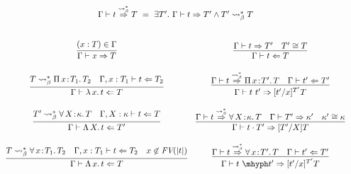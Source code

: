 \documentclass{article}
\newcommand{\abs}[4]{{#1}\, #2\! : \! #3.\, #4}
\newcommand{\absu}[3]{{#1}\, #2.\, #3}
\newcommand{\tpcheck}[0]{\Leftarrow}
\newcommand{\tpsynth}[0]{\Rightarrow}
\newcommand{\tpsynthleads}[0]{\ensuremath{\overset{\leadsto_\beta^*}{\Rightarrow}}}
\begin{document}
\begin{figure}
  \[
    \begin{array}{c}
      \Gamma \vdash t \tpsynthleads T\ =\ \exists T'.\ \Gamma
      \vdash t \tpsynth T' \land T' \leadsto_\beta^* T
      \\ \\ \\
  \begin{array}{cc}
    \infer{\Gamma\vdash x\tpsynth T}{(x : T)\in\Gamma} &
    \infer{\Gamma\vdash t\tpcheck T}{\Gamma\vdash t\tpsynth T' & T' \cong T} \\ \\
    \infer{\Gamma\vdash \absu{\lambda}{x}{t} \tpcheck T}{T \leadsto_\beta^* \abs{\Pi}{x}{T_1}{T_2} & \Gamma,x:T_1\vdash t\tpcheck T_2} &
    \infer{\Gamma\vdash t\ t' \tpsynth [t'/x]^{T'}T}{\Gamma\vdash t \tpsynthleads \abs{\Pi}{x}{T'}{T} & \Gamma\vdash t' \tpcheck T'} \\ \\

    \infer{\Gamma\vdash \absu{\Lambda}{X}{t} \tpcheck T'}
          {T' \leadsto_\beta^* \abs{\forall}{X}{\kappa}{T} & \Gamma,X:\kappa\vdash t \tpcheck T} &
    \infer{\Gamma\vdash t \cdot T' \tpsynth [T'/X]T}
          {\Gamma\vdash t \tpsynthleads \abs{\forall}{X}{\kappa}{T} & \Gamma\vdash T' \tpsynth \kappa' & \kappa'\cong\kappa} \\ \\

    \infer{\Gamma\vdash \absu{\Lambda}{x}{t} \tpcheck T}
          {T \leadsto_\beta^* \abs{\forall}{x}{T_1}{T_2} & \Gamma,x:T_1\vdash t \tpcheck T_2 & x\not\in\textit{FV}(|t|)} &
    \infer{\Gamma\vdash t\ \mhyph t' \tpsynth [t'/x]^{T'}T}{\Gamma\vdash t \tpsynthleads \abs{\forall}{x}{T'}{T} & \Gamma\vdash t' \tpcheck T'} \\ \\


\end{array}
\end{array}\]
\end{figure}
\end{document}
